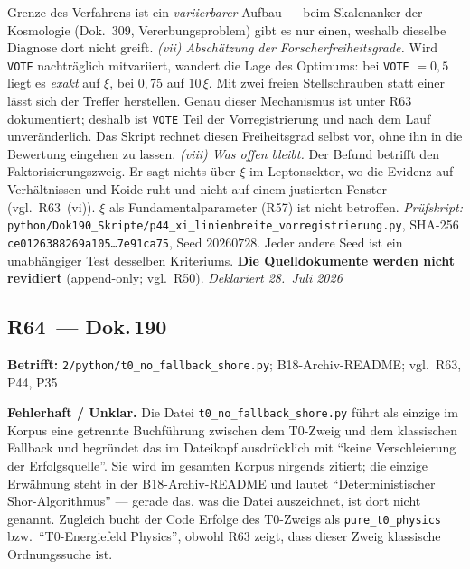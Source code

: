 Grenze des Verfahrens ist ein \emph{variierbarer} Aufbau --- beim
Skalenanker der Kosmologie (Dok.~309, Vererbungsproblem) gibt es nur einen,
weshalb dieselbe Diagnose dort nicht greift.
\emph{(vii) Abschätzung der Forscherfreiheitsgrade.} Wird \texttt{VOTE}
nachträglich mitvariiert, wandert die Lage des Optimums: bei
\texttt{VOTE} $= 0{,}5$ liegt es \emph{exakt} auf $\xi$, bei $0{,}75$ auf
$10\,\xi$. Mit zwei freien Stellschrauben statt einer lässt sich der Treffer
herstellen. Genau dieser Mechanismus ist unter R63 dokumentiert; deshalb ist
\texttt{VOTE} Teil der Vorregistrierung und nach dem Lauf unveränderlich.
Das Skript rechnet diesen Freiheitsgrad selbst vor, ohne ihn in die
Bewertung eingehen zu lassen.
\emph{(viii) Was offen bleibt.} Der Befund betrifft den Faktorisierungszweig.
Er sagt nichts über $\xi$ im Leptonsektor, wo die Evidenz auf Verhältnissen
und Koide ruht und nicht auf einem justierten Fenster (vgl.\ R63~(vi)).
$\xi$ als Fundamentalparameter (R57) ist nicht betroffen.
\emph{Prüfskript:}
\texttt{python/\allowbreak Dok190\_\allowbreak Skripte/\allowbreak p44\_\allowbreak xi\_\allowbreak linienbreite\_\allowbreak vorregistrierung.py},
SHA-256 \texttt{ce0126388269a105\ldots{}7e91ca75}, Seed $20260728$.
Jeder andere Seed ist ein unabhängiger Test desselben Kriteriums.
\textbf{Die Quelldokumente werden nicht revidiert}
(append-only; vgl.\ R50). \emph{Deklariert 28.~Juli 2026}

\medskip

\subsection*{R64~--- Dok.\,190}

\noindent\textbf{Betrifft:} \texttt{2/python/t0\_no\_fallback\_shore.py};
B18-Archiv-README; vgl.\ R63, P44, P35

\smallskip\noindent\textbf{Fehlerhaft / Unklar.}\quad
Die Datei \texttt{t0\_no\_fallback\_shore.py} führt als einzige im Korpus
eine getrennte Buchführung zwischen dem T0-Zweig und dem klassischen
Fallback und begründet das im Dateikopf ausdrücklich mit
\enquote{keine Verschleierung der Erfolgsquelle}. Sie wird im gesamten
Korpus nirgends zitiert; die einzige Erwähnung steht in der
B18-Archiv-README und lautet \enquote{Deterministischer
Shor-Algorithmus} --- gerade das, was die Datei auszeichnet, ist dort
nicht genannt. Zugleich bucht der Code Erfolge des T0-Zweigs als
\texttt{pure\_t0\_physics} bzw.\ \enquote{T0-Energiefeld Physics},
obwohl R63 zeigt, dass dieser Zweig klassische Ordnungssuche ist.

